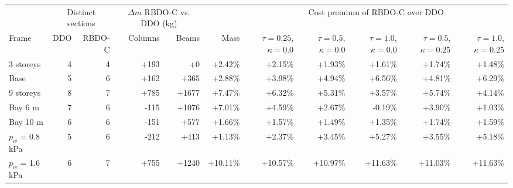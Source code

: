\begin{tabular}{lrrrrrrrrrr}
\toprule
 & \multicolumn{2}{c}{Distinct sections} & \multicolumn{2}{c}{$\Delta m$ RBDO-C vs. DDO (kg)} & & \multicolumn{5}{c}{Cost premium of RBDO-C over DDO} \\
\cmidrule(lr){2-3}\cmidrule(lr){4-5}\cmidrule(lr){7-11}
Frame & DDO & RBDO-C & Columns & Beams & Mass & $\tau=0.25$, $\kappa=0.0$ & $\tau=0.5$, $\kappa=0.0$ & $\tau=1.0$, $\kappa=0.0$ & $\tau=0.5$, $\kappa=0.25$ & $\tau=1.0$, $\kappa=0.25$ \\
\midrule
3 storeys & 4 & 4 & +193 & +0 & +2.42\% & +2.15\% & +1.93\% & +1.61\% & +1.74\% & +1.48\% \\
Base & 5 & 6 & +162 & +365 & +2.88\% & +3.98\% & +4.94\% & +6.56\% & +4.81\% & +6.29\% \\
9 storeys & 8 & 7 & +785 & +1677 & +7.47\% & +6.32\% & +5.31\% & +3.57\% & +5.74\% & +4.14\% \\
Bay 6 m & 7 & 6 & -115 & +1076 & +7.01\% & +4.59\% & +2.67\% & -0.19\% & +3.90\% & +1.03\% \\
Bay 10 m & 6 & 6 & -151 & +577 & +1.66\% & +1.57\% & +1.49\% & +1.35\% & +1.74\% & +1.59\% \\
$p_w$ = 0.8 kPa & 5 & 6 & -212 & +413 & +1.13\% & +2.37\% & +3.45\% & +5.27\% & +3.55\% & +5.18\% \\
$p_w$ = 1.6 kPa & 6 & 7 & +755 & +1240 & +10.11\% & +10.57\% & +10.97\% & +11.63\% & +11.03\% & +11.63\% \\
\bottomrule
\end{tabular}